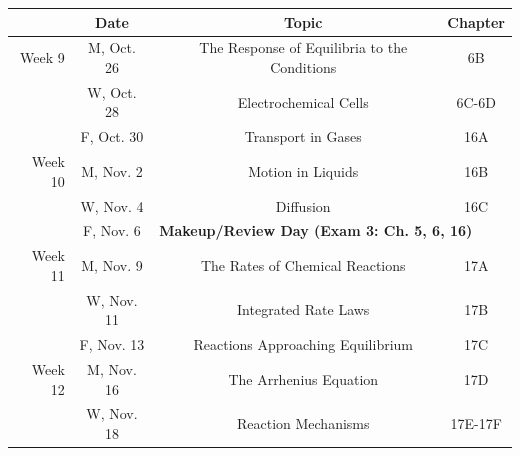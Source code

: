 \documentclass[12pt, letterpaper]{article}
\begin{document}
\begin{tabular}{rcccc}
	            & Date       &                                                                                             & Topic                                        & Chapter \\
	\midrule
	Week 9      & M, Oct. 26 &                                                                                             & The Response of Equilibria to the Conditions & 6B      \\
	            & W, Oct. 28 &                                                                                             & Electrochemical Cells                        & 6C-6D   \\
	            & F, Oct. 30 &                                                                                             & Transport in Gases                           & 16A     \\
	\midrule
	Week 10     & M, Nov. 2  &                                                                                             & Motion in Liquids                            & 16B     \\
	            & W, Nov. 4  &                                                                                             & Diffusion                                    & 16C     \\
	            & F, Nov. 6  & \multicolumn{3}{l}{\textbf{Makeup/Review Day (Exam 3: Ch. 5, 6, 16)}}                                                                                \\
	\midrule
	Week 11     & M, Nov. 9  &                                                                                             & The Rates of Chemical Reactions              & 17A     \\
	            & W, Nov. 11 &                                                                                             & Integrated Rate Laws                         & 17B     \\
	            & F, Nov. 13 &                                                                                             & Reactions Approaching Equilibrium            & 17C     \\
	\midrule
	Week 12     & M, Nov. 16 &                                                                                             & The Arrhenius Equation                       & 17D     \\
	            & W, Nov. 18 &                                                                                             & Reaction Mechanisms                          & 17E-17F \\

\end{tabular}
\end{document}
